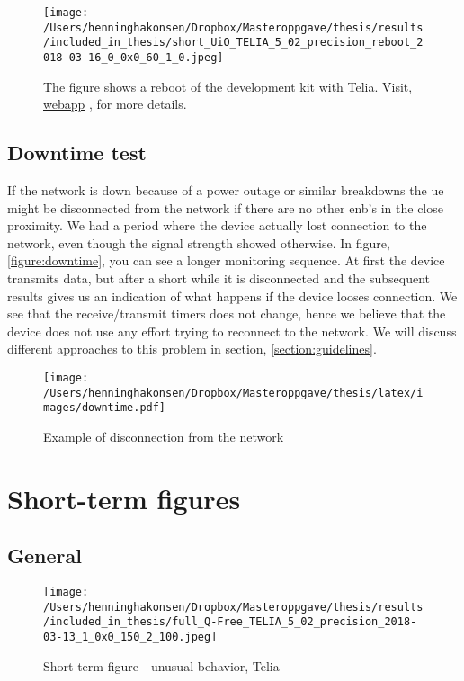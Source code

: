 \documentclass[USenglish]{ifimaster}  %
\begin{document}
\begin{figure}[H]
  \centering
  \texttt{[image: /Users/henninghakonsen/Dropbox/Masteroppgave/thesis/results/included\_in\_thesis/short\_UiO\_TELIA\_5\_02\_precision\_reboot\_2018-03-16\_0\_0x0\_60\_1\_0.jpeg]}
  \caption[Short-term test - device reboot, Telia]{The figure shows a reboot of the development kit with Telia. Visit, \href{http://158.39.77.97:9000/\#/results/UiO\_TELIA\_5.02\_precision\_reboot\_2018-03-16\_0\_0x0\_60\_1\_0}{webapp} \cite{online:result10}, for more details.}
  \label{figure:telia_reboot}
\end{figure}

\subsection{Downtime test} \label{ssection:downtimetest}
If the network is down because of a power outage or similar breakdowns the \acrshort{ue} might be disconnected from the network if there are no other \acrshort{enb}'s in the close proximity. We had a period where the device actually lost connection to the network, even though the signal strength showed otherwise. In figure, \vref{figure:downtime}, you can see a longer monitoring sequence. At first the device transmits data, but after a short while it is disconnected and the subsequent results gives us an indication of what happens if the device looses connection. We see that the receive/transmit timers does not change, hence we believe that the device does not use any effort trying to reconnect to the network. We will discuss different approaches to this problem in section, \vref{section:guidelines}.

\begin{figure}[H]
  \centering
  \texttt{[image: /Users/henninghakonsen/Dropbox/Masteroppgave/thesis/latex/images/downtime.pdf]}
  \caption[Short-term test - downtime]{Example of disconnection from the network}
  \label{figure:downtime}
\end{figure}

\cleardoublepage
\section{Short-term figures}
\subsection{General} \label{ssection:general}
\begin{figure}[H]
  \centering
  \texttt{[image: /Users/henninghakonsen/Dropbox/Masteroppgave/thesis/results/included\_in\_thesis/full\_Q-Free\_TELIA\_5\_02\_precision\_2018-03-13\_1\_0x0\_150\_2\_100.jpeg]}
  \caption{Short-term figure - unusual behavior, Telia}
  \label{figure:2x150_QFREE_TELIA}
\end{figure}
\end{document}
